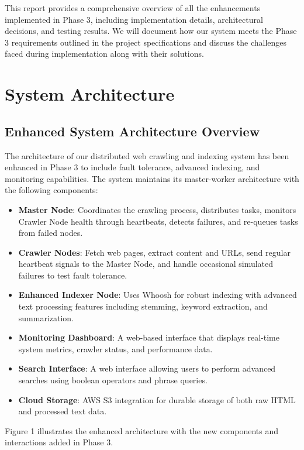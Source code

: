 \documentclass[12pt]{article}
\begin{document}
This report provides a comprehensive overview of all the enhancements implemented in Phase 3, including implementation details, architectural decisions, and testing results. We will document how our system meets the Phase 3 requirements outlined in the project specifications and discuss the challenges faced during implementation along with their solutions. 

\section{System Architecture}

\subsection{Enhanced System Architecture Overview}
The architecture of our distributed web crawling and indexing system has been enhanced in Phase 3 to include fault tolerance, advanced indexing, and monitoring capabilities. The system maintains its master-worker architecture with the following components:

\begin{itemize}
    \item \textbf{Master Node}: Coordinates the crawling process, distributes tasks, monitors Crawler Node health through heartbeats, detects failures, and re-queues tasks from failed nodes.
    \item \textbf{Crawler Nodes}: Fetch web pages, extract content and URLs, send regular heartbeat signals to the Master Node, and handle occasional simulated failures to test fault tolerance.
    \item \textbf{Enhanced Indexer Node}: Uses Whoosh for robust indexing with advanced text processing features including stemming, keyword extraction, and summarization.
    \item \textbf{Monitoring Dashboard}: A web-based interface that displays real-time system metrics, crawler status, and performance data.
    \item \textbf{Search Interface}: A web interface allowing users to perform advanced searches using boolean operators and phrase queries.
    \item \textbf{Cloud Storage}: AWS S3 integration for durable storage of both raw HTML and processed text data.
\end{itemize}

Figure 1 illustrates the enhanced architecture with the new components and interactions added in Phase 3.
\end{document}
